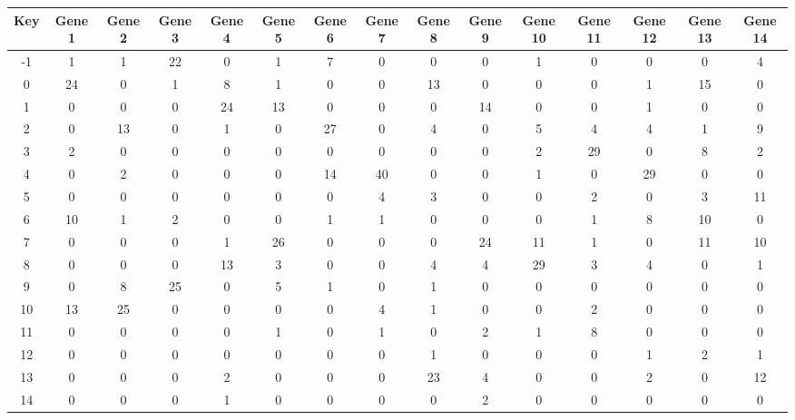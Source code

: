\begin{tabular}{|c|c|c|c|c|c|c|c|c|c|c|c|c|c|c|}
\hline
Key & Gene 1 & Gene 2 & Gene 3 & Gene 4 & Gene 5 & Gene 6 & Gene 7 & Gene 8 & Gene 9 & Gene 10 & Gene 11 & Gene 12 & Gene 13 & Gene 14 \\
\hline
-1 & 1 & 1 & 22 & 0 & 1 & 7 & 0 & 0 & 0 & 1 & 0 & 0 & 0 & 4 \\
0 & 24 & 0 & 1 & 8 & 1 & 0 & 0 & 13 & 0 & 0 & 0 & 1 & 15 & 0 \\
1 & 0 & 0 & 0 & 24 & 13 & 0 & 0 & 0 & 14 & 0 & 0 & 1 & 0 & 0 \\
2 & 0 & 13 & 0 & 1 & 0 & 27 & 0 & 4 & 0 & 5 & 4 & 4 & 1 & 9 \\
3 & 2 & 0 & 0 & 0 & 0 & 0 & 0 & 0 & 0 & 2 & 29 & 0 & 8 & 2 \\
4 & 0 & 2 & 0 & 0 & 0 & 14 & 40 & 0 & 0 & 1 & 0 & 29 & 0 & 0 \\
5 & 0 & 0 & 0 & 0 & 0 & 0 & 4 & 3 & 0 & 0 & 2 & 0 & 3 & 11 \\
6 & 10 & 1 & 2 & 0 & 0 & 1 & 1 & 0 & 0 & 0 & 1 & 8 & 10 & 0 \\
7 & 0 & 0 & 0 & 1 & 26 & 0 & 0 & 0 & 24 & 11 & 1 & 0 & 11 & 10 \\
8 & 0 & 0 & 0 & 13 & 3 & 0 & 0 & 4 & 4 & 29 & 3 & 4 & 0 & 1 \\
9 & 0 & 8 & 25 & 0 & 5 & 1 & 0 & 1 & 0 & 0 & 0 & 0 & 0 & 0 \\
10 & 13 & 25 & 0 & 0 & 0 & 0 & 4 & 1 & 0 & 0 & 2 & 0 & 0 & 0 \\
11 & 0 & 0 & 0 & 0 & 1 & 0 & 1 & 0 & 2 & 1 & 8 & 0 & 0 & 0 \\
12 & 0 & 0 & 0 & 0 & 0 & 0 & 0 & 1 & 0 & 0 & 0 & 1 & 2 & 1 \\
13 & 0 & 0 & 0 & 2 & 0 & 0 & 0 & 23 & 4 & 0 & 0 & 2 & 0 & 12 \\
14 & 0 & 0 & 0 & 1 & 0 & 0 & 0 & 0 & 2 & 0 & 0 & 0 & 0 & 0 \\
\hline
\end{tabular}
